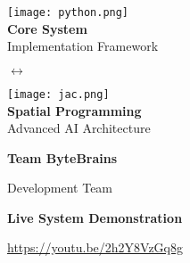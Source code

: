 \documentclass[12pt,a4paper]{article}
\begin{document}
\begin{titlepage}
\begin{tcolorbox}[
        colback=premiumgray,
        colframe=deepblue,
        boxrule=2pt,
        arc=3mm,
        width=0.9\textwidth
    ]
        \begin{minipage}{0.35\textwidth}
            \centering
            \texttt{[image: python.png]}
            \\[0.5cm]
            {\large\textbf{Core System}}\\
            {\small Implementation Framework}
        \end{minipage}
        \hspace{1cm}
        {\Large\color{accentorange}$\leftrightarrow$}
        \hspace{1cm}
        \begin{minipage}{0.35\textwidth}
            \centering
            \texttt{[image: jac.png]}
            \\[0.5cm]
            {\large\textbf{Spatial Programming}}\\
            {\small Advanced AI Architecture}
        \end{minipage}
    \end{tcolorbox}
    
    \vspace{1.5cm}
    
    {\LARGE\textbf{\color{deepblue}Team ByteBrains}\par}
    \vspace{0.5cm}
    {\large Development Team\par}
    
    \vspace{1.5cm}
    
    \begin{tcolorbox}[
        colback=techblue!10,
        colframe=techblue,
        boxrule=2pt,
        arc=3mm,
        width=0.85\textwidth
    ]
        \centering
        {\large\textbf{\color{techblue}Live System Demonstration}\par}
        \vspace{0.3cm}
        {\Large\color{cyan}\url{https://youtu.be/2h2Y8VzGq8g}\par}
    \end{tcolorbox}
    
    \vspace{1.5cm}
    
    
\end{titlepage}

\thispagestyle{empty}
\end{document}
